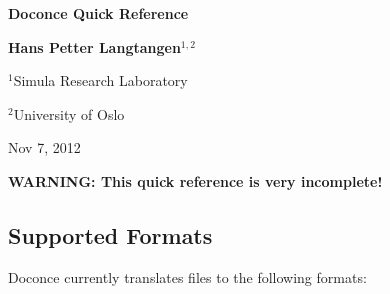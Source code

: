 \documentclass[twoside]{article}
\begin{document}





\begin{center}
{\LARGE\bf Doconce Quick Reference}
\end{center}





\begin{center}
{\bf Hans Petter Langtangen${}^{1, 2}$} \\ [0mm]
\end{center}

\begin{center}
\centerline{{\small ${}^1$Simula Research Laboratory}}
\centerline{{\small ${}^2$University of Oslo}}
\end{center}





\begin{center}
Nov 7, 2012
\end{center}

\vspace{1cm}



\tableofcontents

\vspace{1cm} %






\textbf{WARNING: This quick reference is very incomplete!}

\subsection{Supported Formats}

Doconce currently translates files to the following formats:
\end{document}
